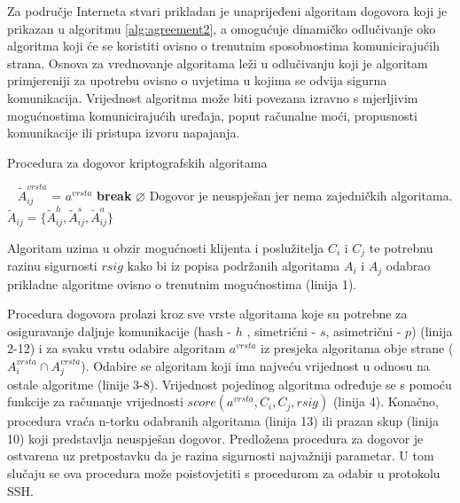 Za područje Interneta stvari prikladan je unaprijeđeni algoritam dogovora koji je
prikazan u algoritmu \ref{alg:agreement2}, a omogućuje dinamičko
odlučivanje oko algoritma koji će se koristiti ovisno o trenutnim sposobnostima
komunicirajućih strana.
Osnova za vrednovanje algoritama leži u odlučivanju koji je algoritam
primjereniji za upotrebu ovisno o uvjetima u kojima se odvija sigurna
komunikacija. Vrijednost algoritma može biti povezana izravno s mjerljivim
mogućnostima komunicirajućih uređaja, poput računalne moći, propusnosti
komunikacije ili pristupa izvoru napajanja.

\begin{algorithm}
\caption{Procedura za dogovor kriptografskih algoritama}
\label{alg:agreement2}
\begin{algorithmic}[1]
    \
		\State $\widetilde{A}^{vrsta}_{ij}$ = $a^{vrsta}$
		\State \textbf{break}
	    \EndIf
	\EndFor
	\State \Return $\varnothing$ \Comment Dogovor je neuspješan jer nema zajedničkih algoritama.
	\EndIf
    \EndFor
    \State \Return 
    $\widetilde{A}_{ij}=\{\widetilde{A}^{h}_{ij},\widetilde{A}^{s}_{ij},\widetilde{A}^{a}_{ij}\}$
\EndProcedure
\end{algorithmic}
\end{algorithm}

Algoritam uzima u obzir mogućnosti klijenta i poslužitelja $C_i$ i $C_j$ te
potrebnu razinu sigurnosti $rsig$ kako bi iz popisa podržanih algoritama
$A_i$ i $A_j$ odabrao prikladne algoritme ovisno o trenutnim mogućnostima (linija 1).

Procedura dogovora prolazi kroz sve vrste algoritama koje su potrebne za
osiguravanje daljnje komunikacije (hash - $h$ , simetrični - $s$, asimetrični - $p$)
(linija 2-12) i za svaku vrstu odabire algoritam $a^{vrsta}$ iz presjeka
algoritama obje strane ($A^{vrsta}_i \cap A^{vrsta}_j$). Odabire se algoritam
koji ima najveću
vrijednost u odnosu na ostale algoritme (linije 3-8). Vrijednost pojedinog
algoritma određuje
se s pomoću funkcije za računanje vrijednosti $score(a^{vrsta},C_i,C_j,rsig)$
(linija 4). Konačno, procedura vraća n-torku odabranih algoritama (linija 13)
ili prazan skup (linija 10) koji predstavlja neuspješan dogovor. Predložena
procedura za dogovor je ostvarena uz pretpostavku da je razina sigurnosti
najvažniji parametar. U tom slučaju se ova procedura može poistovjetiti s
procedurom za odabir u protokolu SSH.

